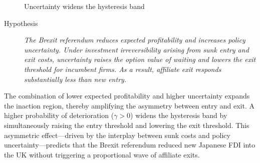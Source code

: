 \documentclass[preprint,11pt,authoryear]{elsarticle}
\begin{document}
\begin{figure}[ht]
\centering
\footnotesize
{}
\caption{Uncertainty widens the hysteresis band}\label{fig:band}
\end{figure}

\begin{description}
    \item[Hypothesis] \textit{The Brexit referendum reduces expected profitability and increases policy uncertainty. Under investment irreversibility arising from sunk entry and exit costs, uncertainty raises the option value of waiting and lowers the exit threshold for incumbent firms. As a result, affiliate exit responds substantially less than new entry.}
\end{description}



The combination of lower expected profitability and higher uncertainty expands the inaction region, thereby amplifying the asymmetry between entry and exit. A higher probability of deterioration ($\gamma > 0$) widens the hysteresis band by simultaneously raising the entry threshold and lowering the exit threshold. This asymmetric effect---driven by the interplay between sunk costs and policy uncertainty---predicts that the Brexit referendum reduced new Japanese FDI into the UK without triggering a proportional wave of affiliate exits.
\end{document}
